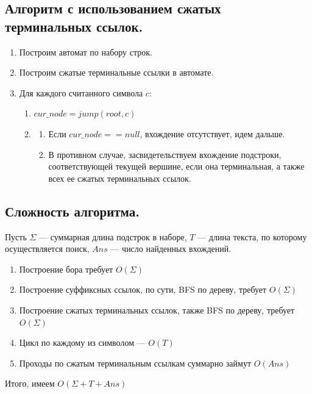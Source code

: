 \subsection{Алгоритм с использованием сжатых терминальных ссылок.}
\begin{enumerate}
    \item Построим автомат по набору строк.
    \item Построим сжатые терминальные ссылки в автомате.
    \item Для каждого считанного символа $c$:
        \begin{enumerate}
            \item $cur\_node = jump(root, c)$
            \item 
                \begin{enumerate}
                    \item Если $cur\_node == null$, вхождение отсутствует, идем дальше.
                    \item В противном случае, засвидетельствуем вхождение подстроки, соответствующей текущей вершине, если она терминальная, а также всех ее сжатых терминальных ссылок.
                \end{enumerate} 
        \end{enumerate}
\end{enumerate}

\subsection{Сложность алгоритма.}
Пусть $\Sigma$ --- суммарная длина подстрок в наборе,  $T$ --- длина текста, по которому осуществляется поиск, $Ans$ --- число найденных вхождений.

\begin{enumerate}
    \item Построение бора требует $O(\Sigma)$
    \item Построение суффиксных ссылок, по сути, BFS по дереву, требует  $O(\Sigma)$
    \item Построение сжатых терминальных ссылок, также BFS по дереву, требует $O(\Sigma)$
    \item Цикл по каждому из символом --- $O(T)$
    \item Проходы по сжатым терминальным ссылкам суммарно займут  $O(Ans)$
\end{enumerate}

Итого, имеем $O(\Sigma + T + Ans)$
